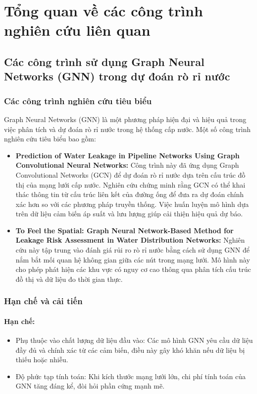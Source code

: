\section{Tổng quan về các công trình nghiên cứu liên quan}

\subsection{Các công trình sử dụng Graph Neural Networks (GNN) trong dự đoán rò rỉ nước}

\subsubsection{Các công trình nghiên cứu tiêu biểu}
Graph Neural Networks (GNN) là một phương pháp hiện đại và hiệu quả trong việc phân tích và dự đoán rò rỉ nước trong hệ thống cấp nước. Một số công trình nghiên cứu tiêu biểu bao gồm:

\begin{itemize}
    \item \textbf{Prediction of Water Leakage in Pipeline Networks Using Graph Convolutional Neural Networks:} Công trình này\cite{Sahin2023} đã ứng dụng Graph Convolutional Networks (GCN) để dự đoán rò rỉ nước dựa trên cấu trúc đồ thị của mạng lưới cấp nước. Nghiên cứu chứng minh rằng GCN có thể khai thác thông tin từ cấu trúc liên kết của đường ống để đưa ra dự đoán chính xác hơn so với các phương pháp truyền thống. Việc huấn luyện mô hình dựa trên dữ liệu cảm biến áp suất và lưu lượng giúp cải thiện hiệu quả dự báo.
    \item \textbf{To Feel the Spatial: Graph Neural Network-Based Method for Leakage Risk Assessment in Water Distribution Networks:} Nghiên cứu này\cite{Wu2024} tập trung vào đánh giá rủi ro rò rỉ nước bằng cách sử dụng GNN để nắm bắt mối quan hệ không gian giữa các nút trong mạng lưới. Mô hình này cho phép phát hiện các khu vực có nguy cơ cao thông qua phân tích cấu trúc đồ thị và dữ liệu đo thời gian thực.
\end{itemize}

\subsubsection{Hạn chế và cải tiến}

\paragraph{Hạn chế:}
\begin{itemize}
    \item Phụ thuộc vào chất lượng dữ liệu đầu vào: Các mô hình GNN yêu cầu dữ liệu đầy đủ và chính xác từ các cảm biến, điều này gây khó khăn nếu dữ liệu bị thiếu hoặc nhiễu.
    \item Độ phức tạp tính toán: Khi kích thước mạng lưới lớn, chi phí tính toán của GNN tăng đáng kể, đòi hỏi phần cứng mạnh mẽ.
\end{itemize}

